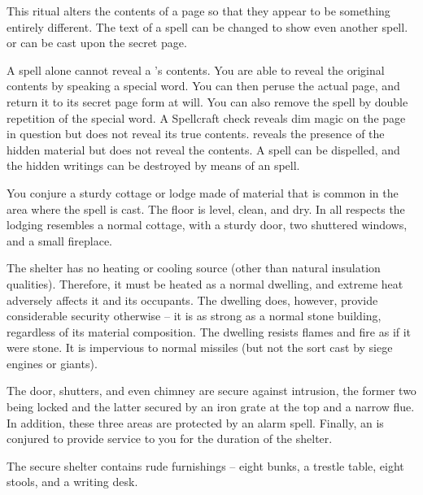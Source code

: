 \spelleffect This ritual alters the contents of a page so that they appear to be something entirely different. The text of a spell can be changed to show even another spell.  or  can be cast upon the secret page.
\par A  spell alone cannot reveal a 's contents. You are able to reveal the original contents by speaking a special word. You can then peruse the actual page, and return it to its secret page form at will. You can also remove the spell by double repetition of the special word.
\spellnotes A Spellcraft check reveals dim magic on the page in question but does not reveal its true contents.  reveals the presence of the hidden material but does not reveal the contents. A  spell can be dispelled, and the hidden writings can be destroyed by means of an  spell.

\spelldur{\durext \dismissable}
\spelleffect You conjure a sturdy cottage or lodge made of material that is common in the area where the spell is cast. The floor is level, clean, and dry. In all respects the lodging resembles a normal cottage, with a sturdy door, two shuttered windows, and a small fireplace.
\par The shelter has no heating or cooling source (other than natural insulation qualities). Therefore, it must be heated as a normal dwelling, and extreme heat adversely affects it and its occupants. The dwelling does, however, provide considerable security otherwise -- it is as strong as a normal stone building, regardless of its material composition. The dwelling resists flames and fire as if it were stone. It is impervious to normal missiles (but not the sort cast by siege engines or giants).
\par The door, shutters, and even chimney are secure against intrusion, the former two being locked and the latter secured by an iron grate at the top and a narrow flue. In addition, these three areas are protected by an alarm spell. Finally, an  is conjured to provide service to you for the duration of the shelter.
\par The secure shelter contains rude furnishings -- eight bunks, a trestle table, eight stools, and a writing desk.

